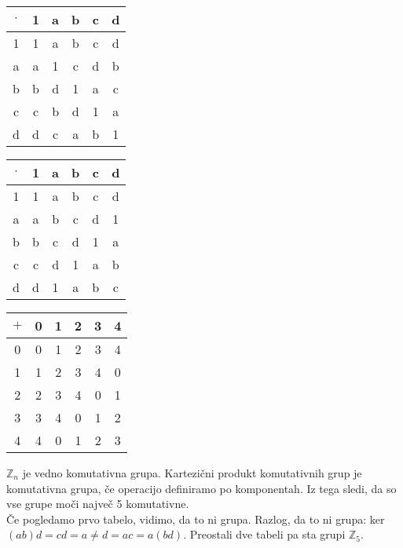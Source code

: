 \documentclass[a4paper,12pt]{article}
\begin{document}
\begin{itemize}
\begin{table}[!hpb]
\begin{minipage}[b]{0.30\linewidth}
\centering
\begin{tabular}{c|ccccc}
$\cdot$ & 1 & a & b & c & d \\
\hline
1 & 1 & a & b & c & d \\
a & a & 1 & c & d & b \\
b & b & d & 1 & a & c \\
c & c & b & d & 1 & a \\
d & d & c & a & b & 1 \\
\end{tabular}
\end{minipage}
\hspace{0.5cm}
\begin{minipage}[b]{0.30\linewidth}
\centering
\begin{tabular}{c|ccccc}
$\cdot$ & 1 & a & b & c & d \\
\hline
1 & 1 & a & b & c & d \\
a & a & b & c & d & 1 \\
b & b & c & d & 1 & a \\
c & c & d & 1 & a & b \\
d & d & 1 & a & b & c \\
\end{tabular}
\end{minipage}
\hspace{0.5cm}
\begin{minipage}[b]{0.30\linewidth}
\centering
\begin{tabular}{c|ccccc}
$+$ & 0 & 1 & 2 & 3 & 4 \\
\hline
0 & 0 & 1 & 2 & 3 & 4 \\
1 & 1 & 2 & 3 & 4 & 0 \\
2 & 2 & 3 & 4 & 0 & 1 \\
3 & 3 & 4 & 0 & 1 & 2 \\
4 & 4 & 0 & 1 & 2 & 3 \\
\end{tabular}
\end{minipage}
\end{table}

$\mathbb{Z}_n$ je vedno komutativna grupa. Kartezični produkt komutativnih grup je komutativna grupa, če operacijo definiramo po komponentah. Iz tega sledi, da so vse grupe moči največ 5 komutativne. \\

Če pogledamo prvo tabelo, vidimo, da to ni grupa. Razlog, da to ni grupa: ker $(ab)d=cd=a \neq d=ac=a(bd)$. Preostali dve tabeli pa sta grupi $\mathbb{Z}_5$.

\end{itemize}
\end{document}
